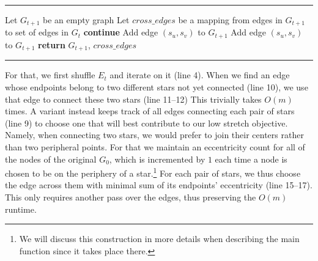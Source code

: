 \begin{center}
  \rule{\textwidth}{.3pt}
  \begin{algorithmic}[1]
      \State Let $G_{t+1}$ be an empty graph
      \State Let $cross\_edges$ be a mapping from edges in $G_{t+1}$ to set of edges in $G_t$
          \State \textbf{continue}
        \EndIf
          \State Add edge $(s_u, s_v)$ to $G_{t+1}$
        \EndIf
      \EndFor
          \State Add edge $(s_u, s_v)$ to $G_{t+1}$
        \EndFor
      \EndIf
      \State \textbf{return} $G_{t+1}$, $cross\_edges$
    \EndFunction
  \end{algorithmic}
  \rule{\textwidth}{.3pt}
\end{center}

For that, we first shuffle $E_t$ and iterate on it (line 4). When we find an edge whose endpoints
belong to two different stars not yet connected (line 10), we use that edge to connect these two
stars (line 11--12) This trivially takes $O(m)$ times.  A variant instead keeps track of all edges
connecting each pair of stars (line 9) to choose one that will best contribute to our low stretch
objective. Namely, when connecting two stars, we would prefer to join their centers rather than two
peripheral points. For that we maintain an eccentricity count for all of the nodes of the original
$G_0$, which is incremented by $1$ each time a node is chosen to be on the periphery of a
star.\footnote{We will discuss this construction in more details when describing the main \gtx{}
function since it takes place there.} For each pair of stars, we thus choose the edge across them
with minimal sum of its endpoints' eccentricity (line 15--17). This only requires another pass over the edges, thus preserving the
$O(m)$ runtime.


